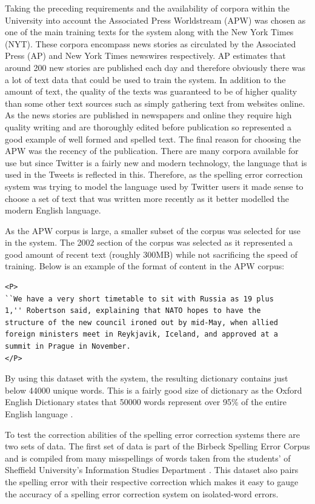 Taking the preceding requirements and the availability of corpora within the University into account the Associated Press Worldstream (APW) \cite{} was chosen as one of the main training texts for the system along with the New York Times (NYT). These corpora encompass news stories as circulated by the Associated Press (AP) and New York Times newswires respectively. AP estimates that around 200 new stories are published each day \cite{} and therefore obviously there was a lot of text data that could be used to train the system. In addition to the amount of text, the quality of the texts was guaranteed to be of higher quality than some other text sources such as simply gathering text from websites online. As the news stories are published in newspapers and online they require high quality writing and are thoroughly edited before publication so represented a good example of well formed and spelled text. The final reason for choosing the APW was the recency of the publication. There are many corpora available for use but since Twitter is a fairly new and modern technology, the language that is used in the Tweets is reflected in this. Therefore, as the spelling error correction system was trying to model the language used by Twitter users it made sense to choose a set of text that was written more recently as it better modelled the modern English language.

As the APW corpus is large, a smaller subset of the corpus was selected for use in the system. The 2002 section of the corpus was selected as it represented a good amount of recent text (roughly 300MB) while not sacrificing the speed of training. Below is an example of the format of content in the APW corpus:

\begin{verbatim}
<P>
``We have a very short timetable to sit with Russia as 19 plus
1,'' Robertson said, explaining that NATO hopes to have the
structure of the new council ironed out by mid-May, when allied
foreign ministers meet in Reykjavik, Iceland, and approved at a
summit in Prague in November.
</P>
\end{verbatim}

By using this dataset with the system, the resulting dictionary contains just below 44000 unique words. This is a fairly good size of dictionary as the Oxford English Dictionary states that 50000 words represent over 95\% of the entire English language \cite{}.

To test the correction abilities of the spelling error correction systems there are two sets of data. The first set of data is part of the Birbeck Spelling Error Corpus \cite{} and is compiled from many misspellings of words taken from the students' of Sheffield University's Information Studies Department \cite{}. This dataset also pairs the spelling error with their respective correction which makes it easy to gauge the accuracy of a spelling error correction system on isolated-word errors.

